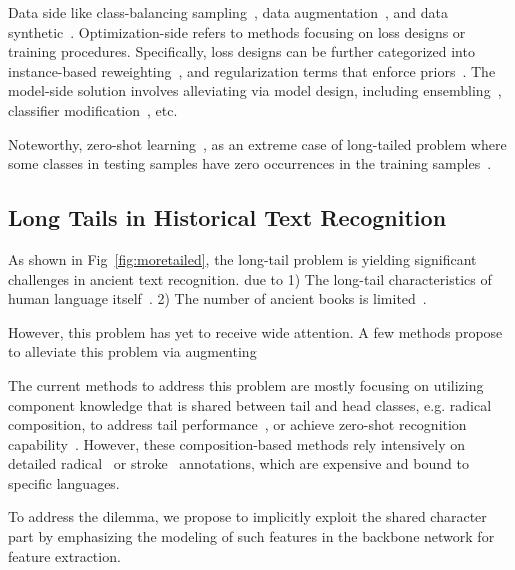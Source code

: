 Data side like class-balancing sampling~\cite{upsam}, data augmentation~\cite{cutmix}, and data synthetic~\cite{smote,hzsl}. 
Optimization-side refers to methods focusing on loss designs or training procedures. Specifically, loss designs can be further categorized into instance-based reweighting~\cite{focal,otem}, and regularization terms that enforce priors~\cite{fudanvi,sanicdar23,logvar}.
The model-side solution involves alleviating via model design, including ensembling~\cite{fle,flmoe}, classifier modification~\cite{normrob}, etc.

Noteworthy, zero-shot learning~\cite{gzsl-survey}, as an extreme case of long-tailed problem where some classes in testing samples have zero occurrences in the training samples~\cite{olt}.

\subsection{Long Tails in Historical Text Recognition}

As shown in Fig~\ref{fig:moretailed}, the long-tail problem is yielding significant challenges in ancient text recognition. 
due to 1) The long-tail characteristics of human language itself~\cite{}. 2) The number of ancient books is limited~\cite{}. 

However, this problem has yet to receive wide attention. 
A few methods propose to alleviate this problem via augmenting~\cite{aaoracle,atlt}

The current methods to address this problem are mostly focusing on utilizing component knowledge that is shared between tail and head classes, e.g. radical composition, to address tail performance~\cite{obcmk2,sanicdar23,fudanvi}, or achieve zero-shot recognition capability~\cite{jinic21,gold,9412607,DBLP:conf/icfhr/ChandaBHHSS18,wubizhengma}. However, these composition-based methods rely intensively on detailed radical~\cite{fewran} or stroke~\cite{taktak} annotations, which are expensive and bound to specific languages.

To address the dilemma, we propose to implicitly exploit the shared character part by emphasizing the modeling of such features in the backbone network for feature extraction.
